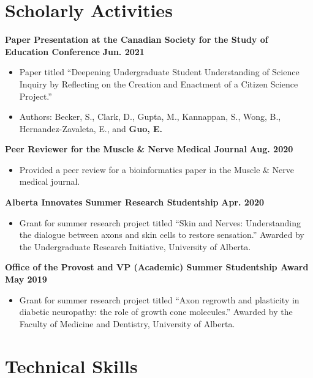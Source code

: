 \documentclass{article}
\begin{document}
\section*{\textcolor{my_colour}{Scholarly Activities}}
\vspace{-.25em} \hrulefill \vspace{.75em}

\textbf{Paper Presentation at the Canadian Society for the Study of Education Conference} \hfill \textbf{Jun. 2021}
\begin{itemize}
    \item Paper titled ``Deepening Undergraduate Student Understanding of Science Inquiry by Reflecting on the Creation and Enactment of a Citizen Science Project.''
    \item Authors: Becker, S., Clark, D., Gupta, M., Kannappan, S., Wong, B., Hernandez-Zavaleta, E., and \textbf{Guo, E.}
\end{itemize}

\textbf{Peer Reviewer for the Muscle \& Nerve Medical Journal} \hfill \textbf{Aug. 2020}
\begin{itemize}
    \item Provided a peer review for a bioinformatics paper in the Muscle \& Nerve medical journal.
\end{itemize}

\textbf{Alberta Innovates Summer Research Studentship} \hfill \textbf{Apr. 2020}
\begin{itemize}
    \item Grant for summer research project titled ``Skin and Nerves: Understanding the dialogue between axons and skin cells to restore sensation.'' Awarded by the Undergraduate Research Initiative, University of Alberta.
\end{itemize}
\textbf{Office of the Provost and VP (Academic) Summer Studentship Award} \hfill \textbf{May 2019}
    \begin{itemize}
        \item Grant for summer research project titled ``Axon regrowth and plasticity in diabetic neuropathy: the role of growth cone molecules.'' Awarded by the Faculty of Medicine and Dentistry, University of Alberta.
    \end{itemize}


\section*{\textcolor{my_colour}{Technical Skills}}
\vspace{-.25em} \hrulefill \vspace{.75em}
\end{document}
